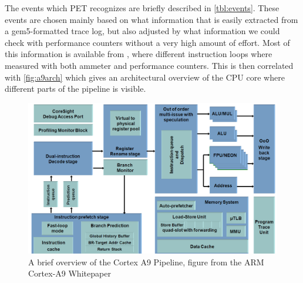The events which PET recognizes are briefly described in \autoref{tbl:events}.
These events are chosen mainly based on what information that is easily
extracted from a gem5-formatted trace log, but also adjusted by what information
we could check with performance counters without a very high amount of effort.
Most of this information is available from \cite{rundehvatum2013exploring},
where different instruction loops where measured with both ammeter and
performance counters. This is then correlated with \autoref{fig:a9arch} which
gives an architectural overview of the CPU core where different parts of the
pipeline is visible.

\begin{figure}
    \centering
    \includegraphics[width=\textwidth]{figs/A9-Pipeline-hres.jpg}
    \caption{A brief overview of the Cortex A9 Pipeline, figure from the ARM Cortex-A9 Whitepaper \cite{a9whitepaper}}
    \label{fig:a9arch}
\end{figure}
